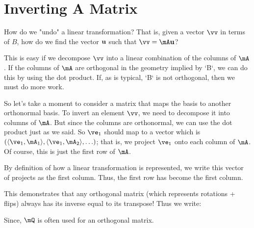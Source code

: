 \section{Inverting A Matrix}

How do we "undo" a linear transformation? That is, given a vector $\vv$
in terms of $B$, how do we find the vector $\bm{\mathrm{u}}$ such that $\vv=\mA\vu$?

This is easy if we decompose $\vv$ into a linear combination of the
columns of $\mA$. If the columns of $\mA$ are orthogonal in the geometry
implied by `B`, we can do this by using the dot product. If, as is
typical, `B` is not orthogonal, then we must do more work.

So let's take a moment to consider a matrix that maps the basis to
another orthonormal basis. To invert an element $\vv$, we need to
decompose it into columns of $\mA$. But since the columns are
orthonormal, we can use the dot product just as we said. So $\ve_1$
should map to a vector which is $\parens{\iprod{\ve_1}{\mA_1},
\iprod{\ve_1}{\mA_2}, \ldots}$; that is, we project $\ve_1$ onto each
column of $\mA$. Of course, this is just the first row of $\mA$.

By definition of how a linear transformation is represented, we write
this vector of projects as the first column. Thus, the first row has
become the first column.

This demonstrates that any orthogonal matrix (which represents
rotations + flips) always has its inverse equal to its transpose! Thus
we write:

\begin{nedqn}
  \mQ
\eqcol
  \mQt
\end{nedqn}

Since, $\mQ$ is often used for an orthogonal matrix.
